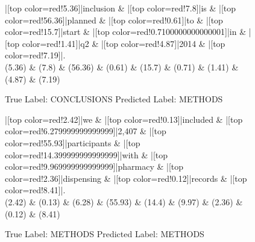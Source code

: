 \documentclass[a4paper, landscape]{article}
\begin{document}
\begin{figure}
\begin{center}
\begin{dependency}
\begin{deptext}
|[top color=red!5.36]|inclusion \& |[top color=red!7.8]|is \& |[top color=red!56.36]|planned \& |[top color=red!0.61]|to \& |[top color=red!15.7]|start \& |[top color=red!0.7100000000000001]|in \& |[top color=red!1.41]|q2 \& |[top color=red!4.87]|2014 \& |[top color=red!7.19]|.\\
(5.36) \& (7.8) \& (56.36) \& (0.61) \& (15.7) \& (0.71) \& (1.41) \& (4.87) \& (7.19)\\
\end{deptext}
\end{dependency}
\end{center}
\caption{True Label: CONCLUSIONS Predicted Label: METHODS}
\end{figure}
\clearpage
\begin{figure}
\begin{center}
\begin{dependency}
\begin{deptext}
|[top color=red!2.42]|we \& |[top color=red!0.13]|included \& |[top color=red!6.279999999999999]|2,407 \& |[top color=red!55.93]|participants \& |[top color=red!14.399999999999999]|with \& |[top color=red!9.969999999999999]|pharmacy \& |[top color=red!2.36]|dispensing \& |[top color=red!0.12]|records \& |[top color=red!8.41]|.\\
(2.42) \& (0.13) \& (6.28) \& (55.93) \& (14.4) \& (9.97) \& (2.36) \& (0.12) \& (8.41)\\
\end{deptext}
\end{dependency}
\end{center}
\caption{True Label: METHODS Predicted Label: METHODS}
\end{figure}
\clearpage
\end{document}
